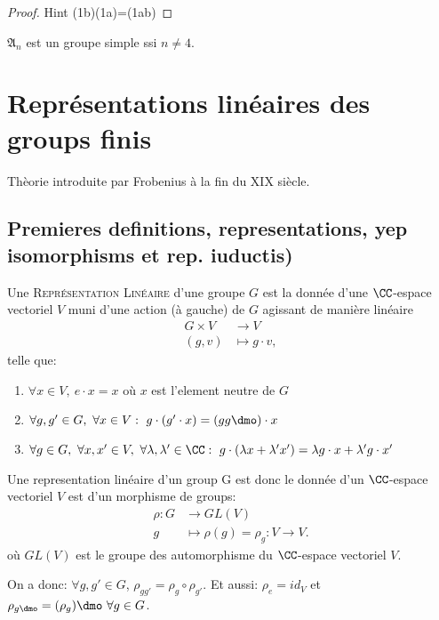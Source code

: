 \begin{proof}
	Hint (1b)(1a)=(1ab)
\end{proof}

\begin{theorem}[Galois]
	$\mathfrak{A}_n$ est un groupe simple ssi $n\neq 4$.
\end{theorem}

\chapter{Représentations linéaires des groups finis}

Thèorie introduite par Frobenius à la fin du XIX siècle.
\section{Premieres definitions, representations, yep isomorphisms et rep. iuductis)} %
\label{sec:premieres_definitions_representations_yep_isomorphisms_et_rep_iuductis}

\begin{definition}
	Une \textsc{Représentation Linéaire} d'une groupe $G$ est la donnée d'une $\CC$-espace vectoriel $V$ muni d'une action (à gauche) de $G$ agissant de manière linéaire
	\begin{align*}
		G\times V & \rightarrow V \\
		(g,v) & \mapsto g\cdot v,		
	\end{align*}
	telle que:
	\begin{enumerate}
		\item $\forall x\in V,\ e\cdot x=x$ où $x$ est l'element neutre de $G$
		\item $\forall g, g' \in G,\ \forall x\in V:\ g\cdot (g'\cdot x)=(gg\dmo)\cdot x$
		\item $\forall g\in G,\ \forall x,x'\in V,\ \forall \lambda,\lambda'\in\CC:\ g\cdot(\lambda x+\lambda'x')=\lambda g\cdot x+\lambda' g\cdot x'$
	\end{enumerate}
\end{definition}

\begin{definition}
Une representation linéaire d'un group G est donc le donnée d'un $\CC$-espace vectoriel $V$ est d'un morphisme de groups:
\begin{align*}
	\rho:G &\rightarrow GL(V)\\
	g &\mapsto \rho(g)=\rho_g:V\rightarrow V.	
\end{align*}                
où $GL(V)$ est le groupe des automorphisme du $\CC$-espace vectoriel $V$.

On a donc: $\forall g,g'\in G$, $\rho_{gg'}=\rho_g\circ \rho_{g'}$. Et aussi: $\rho_e=id_V$ et $\rho_{g\dmo}=(\rho_g)\dmo\ \forall g\in G$.
\end{definition}

